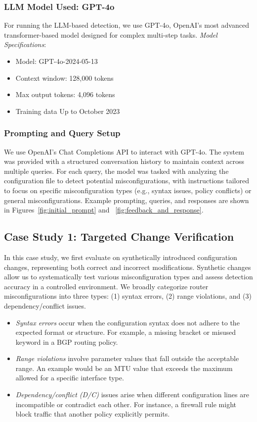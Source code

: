\subsubsection{LLM Model Used: GPT-4o} For running the LLM-based detection, we use GPT-4o, OpenAI's most advanced transformer-based model designed for complex multi-step tasks.
\textit{Model Specifications}:
\begin{itemize}
    \item Model: GPT-4o-2024-05-13
    \item Context window: 128,000 tokens 
    \item Max output tokens: 4,096 tokens
    \item Training data Up to October 2023
\end{itemize}

\subsubsection{Prompting and Query Setup}
We use OpenAI’s Chat Completions API to interact with GPT-4o. The system was provided with a structured conversation history to maintain context across multiple queries. For each query, the model was tasked with analyzing the configuration file to detect potential misconfigurations, with instructions tailored to focus on specific misconfiguration types (e.g., syntax issues, policy conflicts) or general misconfigurations. Example prompting, queries, and responses are shown in Figures~\ref{fig:initial_prompt} and ~\ref{fig:feedback_and_response}.

\subsection{Case Study 1: Targeted Change Verification}
In this case study, we first evaluate \sysname{} on synthetically introduced configuration changes, representing both correct and incorrect modifications. Synthetic changes allow us to systematically test various misconfiguration types and assess detection accuracy in a controlled environment.
We broadly categorize router misconfigurations into three types: (1) syntax errors, (2) range violations, and (3) dependency/conflict issues.
\begin{itemize}
    \item \textit{Syntax errors} occur when the configuration syntax does not adhere to the expected format or structure. For example, a missing bracket or misused keyword in a BGP routing policy.
    \item \textit{Range violations} involve parameter values that fall outside the acceptable range. An example would be an MTU value that exceeds the maximum allowed for a specific interface type.
    \item \textit{Dependency/conflict (D/C)} issues arise when different configuration lines are incompatible or contradict each other. For instance, a firewall rule might block traffic that another policy explicitly permits.
\end{itemize}




